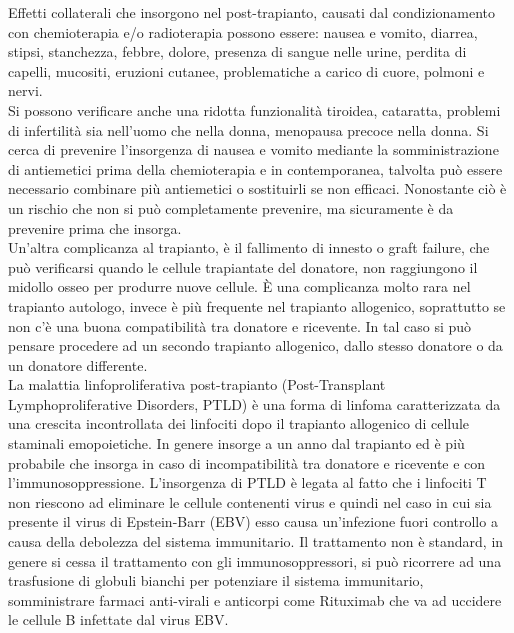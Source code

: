 Effetti collaterali che insorgono nel post-trapianto, causati dal condizionamento con chemioterapia e/o radioterapia 
possono essere: nausea e vomito, diarrea, stipsi, stanchezza, febbre, dolore, presenza di sangue nelle urine, 
perdita di capelli, mucositi, eruzioni cutanee, problematiche a carico di cuore, polmoni e nervi\cite{LLSBLOOD}.\\
Si possono verificare anche una ridotta funzionalità tiroidea, cataratta, problemi di infertilità sia nell’uomo 
che nella donna, menopausa precoce nella donna.
Si cerca di prevenire l’insorgenza di nausea e vomito mediante la somministrazione di antiemetici prima della 
chemioterapia e in contemporanea, talvolta può essere necessario combinare più antiemetici o sostituirli se non 
efficaci. 
Nonostante ciò è un rischio che non si può completamente prevenire, ma sicuramente è da prevenire prima che insorga\cite{STEMCELLS}.\\

Un’altra complicanza al trapianto, è il fallimento di innesto o graft failure, che può verificarsi quando le cellule 
trapiantate del donatore, non raggiungono il midollo osseo per produrre nuove cellule. È una complicanza molto rara 
nel trapianto autologo, invece è più frequente nel trapianto allogenico, soprattutto se non c’è una buona 
compatibilità tra donatore e ricevente. In tal caso si può pensare procedere ad un secondo trapianto allogenico, 
dallo stesso donatore o da un donatore differente\cite{LLSBLOOD}.\\

La malattia linfoproliferativa post-trapianto (Post-Transplant Lymphoproliferative Disorders, PTLD) è una forma di 
linfoma caratterizzata da una crescita incontrollata dei linfociti dopo il trapianto allogenico di cellule staminali 
emopoietiche. In genere insorge a un anno dal trapianto ed è più probabile che insorga in caso di incompatibilità 
tra donatore e ricevente e con l’immunosoppressione.
L’insorgenza di PTLD è legata al fatto che i linfociti T non riescono ad eliminare le cellule contenenti 
virus e quindi nel caso in cui sia presente il virus di Epstein-Barr (EBV) esso causa un’infezione fuori controllo 
a causa della debolezza del sistema immunitario. Il trattamento non è standard, in genere si cessa il trattamento 
con gli immunosoppressori, si può ricorrere ad una trasfusione di globuli bianchi per potenziare il sistema 
immunitario, somministrare farmaci anti-virali e anticorpi come Rituximab che va ad uccidere le cellule B infettate 
dal virus EBV\cite{STEMCELLS}.\\

